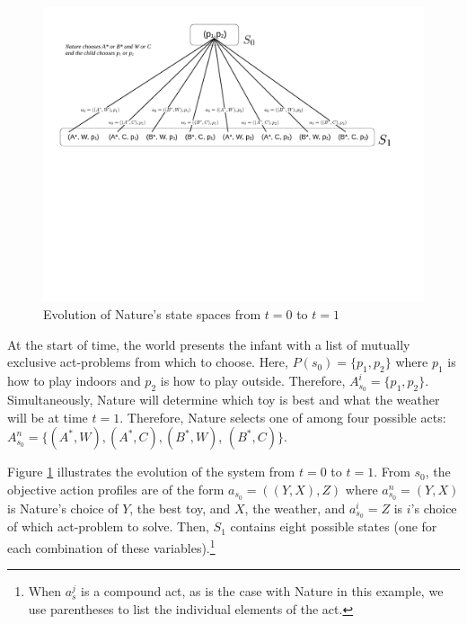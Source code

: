 \documentclass[
11pt,
titlepage,
reqno,
]{article}%
\theoremstyle{definition}
\begin{document}
\begin{figure}[h!]
	\centering
	\includegraphics*[page=1,trim = 0in 4in 0in 0in,scale=.6]{Awareness_Diagrams_All}
	\caption{Evolution of Nature's state spaces from $t=0$ to $t=1$\label{Diag: p-01}}%
\end{figure}

At the start of time, the world presents the infant with a list of mutually exclusive act-problems from which to choose. 
Here, $P(s_0)=\{p_1,p_2\}$ where $p_1$ is how to play indoors and $p_2$ is how to play outside.
Therefore, $A^i_{s_0}=\{p_1,p_2\}$.
Simultaneously, Nature will determine which toy is best and what the weather will be at time $t=1$.
Therefore, Nature selects one of among four possible acts: $A^n_{s_0}=\{(A^\ast,W),(A^\ast,C),(B^\ast,W)$, $(B^\ast,C)\}$.


Figure \ref{Diag: p-01} illustrates the evolution of the system from $t=0$ to $t=1$. 
From $s_0$, the objective action profiles are of the form $a_{s_0}=((Y,X),Z)$ where $a^n_{s_0}=(Y,X)$ is Nature's choice of  $Y$, the best toy, and $X$, the weather, and $a^i_{s_0}=Z$ is $i$'s choice of which act-problem to solve.
Then, $S_1$ contains eight possible states (one for each combination of these variables).\footnote
{
	When $a^j_s$ is a compound act, as is the case with Nature in this example, we use parentheses to list the individual elements of the act.
}
\end{document}
